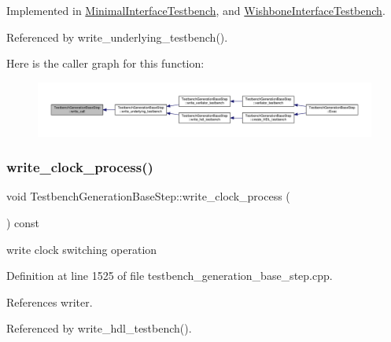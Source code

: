 Implemented in \hyperlink{classMinimalInterfaceTestbench_a646e461dfe469649ac2f67a7dac554b9}{Minimal\+Interface\+Testbench}, and \hyperlink{classWishboneInterfaceTestbench_a6e234d950e3b63e52ab206e23b68531e}{Wishbone\+Interface\+Testbench}.



Referenced by write\+\_\+underlying\+\_\+testbench().

Here is the caller graph for this function\+:
\nopagebreak
\begin{figure}[H]
\begin{center}
\leavevmode
\includegraphics[width=350pt]{dc/d02/classTestbenchGenerationBaseStep_a07a88446a9b569d6776e8d20ea323809_icgraph}
\end{center}
\end{figure}
\mbox{\label{classTestbenchGenerationBaseStep_a96a147c621c5aa82d4a87ef81b4b5c06}} 
\subsubsection{\texorpdfstring{write\+\_\+clock\+\_\+process()}{write\_clock\_process()}}
{\footnotesize\ttfamily void Testbench\+Generation\+Base\+Step\+::write\+\_\+clock\+\_\+process (\begin{DoxyParamCaption}{ }\end{DoxyParamCaption}) const\hspace{0.3cm}{\ttfamily [protected]}}

write clock switching operation 

Definition at line 1525 of file testbench\+\_\+generation\+\_\+base\+\_\+step.\+cpp.



References writer.



Referenced by write\+\_\+hdl\+\_\+testbench().

